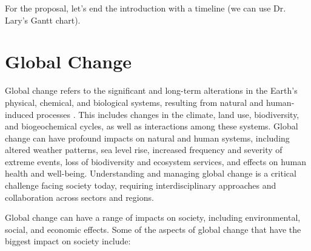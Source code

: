 For the proposal, let's end the introduction with a timeline (we can use Dr. Lary's Gantt chart).


\section{Global Change}

Global change refers to the significant and long-term alterations in the Earth's physical, chemical, and biological systems, resulting from natural and human-induced processes \cite{IPCC2014, IPCC2018, UN2015}. This includes changes in the climate, land use, biodiversity, and biogeochemical cycles, as well as interactions among these systems. Global change can have profound impacts on natural and human systems, including altered weather patterns, sea level rise, increased frequency and severity of extreme events, loss of biodiversity and ecosystem services, and effects on human health and well-being. Understanding and managing global change is a critical challenge facing society today, requiring interdisciplinary approaches and collaboration across sectors and regions.

Global change can have a range of impacts on society, including environmental, social, and economic effects. Some of the aspects of global change that have the biggest impact on society include:

